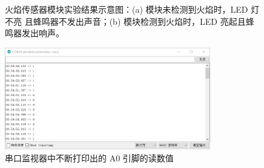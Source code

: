 \documentclass[UTF8, oneside]{ctexbook}
\begin{document}
\begin{figure}[h]
    \centering


    \centering
    \caption{火焰传感器模块实验结果示意图：(a) 模块未检测到火焰时，LED 灯不亮
    且蜂鸣器不发出声音；(b) 模块检测到火焰时，LED 亮起且蜂鸣器发出响声。}
    \label{s9_1}
    
\end{figure}

\begin{figure}[h]
    \centering
    \includegraphics[width=0.8\textwidth]{./result/sensor/9/result1.png}
    \caption{串口监视器中不断打印出的 A0 引脚的读数值}
    \label{s9_2}
\end{figure}
\end{document}
